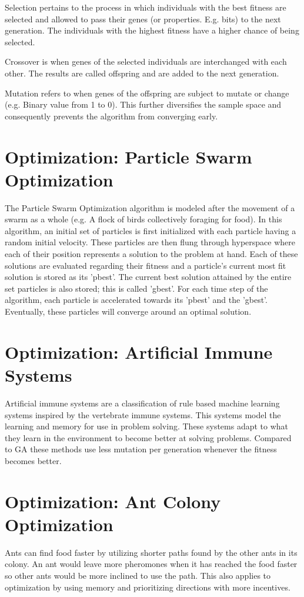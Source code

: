 Selection pertains to the process in which individuals with the best fitness are selected and allowed to pass their genes (or properties. E.g. bits) to the next generation. The individuals with the highest fitness have a higher chance of being selected.

Crossover is when genes of the selected individuals are interchanged with each other. The results are called offspring and are added to the next generation.

Mutation refers to when genes of the offspring are subject to mutate or change (e.g. Binary value from 1 to 0). This further diversifies the sample space and consequently prevents the algorithm from converging early.

\section{Optimization: Particle Swarm Optimization}
The Particle Swarm Optimization \cite{eberhart_kennedy_1995} algorithm is modeled after the movement of a swarm as a whole (e.g. A flock
of birds collectively foraging for food). In this algorithm, an initial set of particles is first initialized with each
particle having a random initial velocity. These particles are then flung through hyperspace where each of their position
represents a solution to the problem at hand. Each of these solutions are evaluated regarding their fitness and a particle's
current most fit solution is stored as its 'pbest'. The current best solution attained by the entire set particles is also stored; this is called 'gbest'. For each time step of the algorithm, each particle is accelerated towards its 'pbest' and the 'gbest'. Eventually, these particles will converge around an optimal solution.

\section{Optimization: Artificial Immune Systems}
Artificial immune systems are a classification of rule based machine learning systems inspired by the vertebrate immune systems. This systems model the learning and memory for use in problem solving. These systems adapt to what they learn in the environment to become better at solving problems. Compared to GA these methods use less mutation per generation whenever the fitness becomes better.

\section{Optimization: Ant Colony Optimization}
Ants can find food faster by utilizing shorter paths found by the other ants in its colony. An ant would leave more pheromones when it has reached the food faster so other ants would be more inclined to use the path. This also applies to optimization by using memory and prioritizing directions with more incentives.

